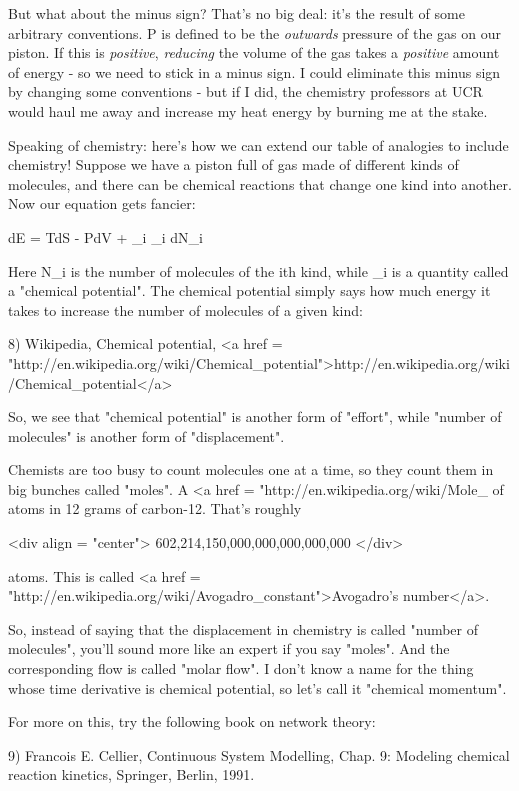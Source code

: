 But what about the minus sign?  That's no big deal: it's the result of
some arbitrary conventions.  P is defined to be the \emph{outwards}
pressure of the gas on our piston.  If this is \emph{positive},
\emph{reducing} the volume of the gas takes a \emph{positive}
amount of energy - so we need to stick in a minus sign.  I could
eliminate this minus sign by changing some conventions - but if I did,
the chemistry professors at UCR would haul me away and increase my
heat energy by burning me at the stake.

Speaking of chemistry: here's how we can extend our table of analogies
to include chemistry!  Suppose we have a piston full of gas made of
different kinds of molecules, and there can be chemical reactions that
change one kind into another.  Now our equation gets fancier:

dE = TdS - PdV + \sum_{i} \mu _{i} dN_{i}

Here N_{i} is the number of molecules of the ith kind, while
\mu _{i} is a quantity called a "chemical potential".
The chemical potential simply says how much energy it takes to
increase the number of molecules of a given kind:

8) Wikipedia, Chemical potential, 
<a href = "http://en.wikipedia.org/wiki/Chemical_potential">http://en.wikipedia.org/wiki/Chemical_potential</a>

So, we see that "chemical potential" is another form of
"effort", while "number of molecules" is another
form of "displacement".

Chemists are too busy to count molecules one at a time, so they count
them in big bunches called "moles".  A <a href =
"http://en.wikipedia.org/wiki/Mole_%
of atoms in 12 grams of carbon-12.  That's roughly

<div align = "center">
                 602,214,150,000,000,000,000,000
</div>

atoms.  This is called <a href =
"http://en.wikipedia.org/wiki/Avogadro_constant">Avogadro's
number</a>.

So, instead of saying that the displacement in chemistry is called
"number of molecules", you'll sound more like an expert if
you say "moles".  And the corresponding flow is called
"molar flow".  I don't know a name for the thing whose time
derivative is chemical potential, so let's call it "chemical
momentum".

For more on this, try the following book on network theory:

9) Francois E. Cellier, Continuous System Modelling, Chap. 9: Modeling
chemical reaction kinetics, Springer, Berlin, 1991.

